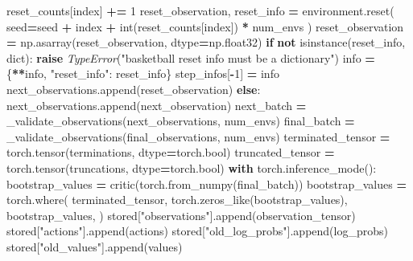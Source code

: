 \documentclass[
  american,
  11pt,
  letterpaper,
]{article}
\newenvironment{Shaded}{\begin{snugshade}}{\end{snugshade}}
\newcommand{\BuiltInTok}[1]{#1}
\newcommand{\ControlFlowTok}[1]{\textcolor[rgb]{0.13,0.29,0.53}{\textbf{#1}}}
\newcommand{\DecValTok}[1]{\textcolor[rgb]{0.00,0.00,0.81}{#1}}
\newcommand{\KeywordTok}[1]{\textcolor[rgb]{0.13,0.29,0.53}{\textbf{#1}}}
\newcommand{\NormalTok}[1]{#1}
\newcommand{\OperatorTok}[1]{\textcolor[rgb]{0.81,0.36,0.00}{\textbf{#1}}}
\newcommand{\PreprocessorTok}[1]{\textcolor[rgb]{0.56,0.35,0.01}{\textit{#1}}}
\newcommand{\StringTok}[1]{\textcolor[rgb]{0.31,0.60,0.02}{#1}}
\renewenvironment{Shaded}{\par\smallskip}{\par\smallskip}
\begin{document}
\begin{Shaded}
\begin{Highlighting}[]
\NormalTok{                reset\_counts[index] }\OperatorTok{+=} \DecValTok{1}
\NormalTok{                reset\_observation, reset\_info }\OperatorTok{=}\NormalTok{ environment.reset(}
\NormalTok{                    seed}\OperatorTok{=}\NormalTok{seed }\OperatorTok{+}\NormalTok{ index }\OperatorTok{+} \BuiltInTok{int}\NormalTok{(reset\_counts[index]) }\OperatorTok{*}\NormalTok{ num\_envs}
\NormalTok{                )}
\NormalTok{                reset\_observation }\OperatorTok{=}\NormalTok{ np.asarray(reset\_observation, dtype}\OperatorTok{=}\NormalTok{np.float32)}
                \ControlFlowTok{if} \KeywordTok{not} \BuiltInTok{isinstance}\NormalTok{(reset\_info, }\BuiltInTok{dict}\NormalTok{):}
                    \ControlFlowTok{raise} \PreprocessorTok{TypeError}\NormalTok{(}\StringTok{"basketball reset info must be a dictionary"}\NormalTok{)}
\NormalTok{                info }\OperatorTok{=}\NormalTok{ \{}\OperatorTok{**}\NormalTok{info, }\StringTok{"reset\_info"}\NormalTok{: reset\_info\}}
\NormalTok{                step\_infos[}\OperatorTok{{-}}\DecValTok{1}\NormalTok{] }\OperatorTok{=}\NormalTok{ info}
\NormalTok{                next\_observations.append(reset\_observation)}
            \ControlFlowTok{else}\NormalTok{:}
\NormalTok{                next\_observations.append(next\_observation)}
\NormalTok{        next\_batch }\OperatorTok{=}\NormalTok{ \_validate\_observations(next\_observations, num\_envs)}
\NormalTok{        final\_batch }\OperatorTok{=}\NormalTok{ \_validate\_observations(final\_observations, num\_envs)}
\NormalTok{        terminated\_tensor }\OperatorTok{=}\NormalTok{ torch.tensor(terminations, dtype}\OperatorTok{=}\NormalTok{torch.}\BuiltInTok{bool}\NormalTok{)}
\NormalTok{        truncated\_tensor }\OperatorTok{=}\NormalTok{ torch.tensor(truncations, dtype}\OperatorTok{=}\NormalTok{torch.}\BuiltInTok{bool}\NormalTok{)}
        \ControlFlowTok{with}\NormalTok{ torch.inference\_mode():}
\NormalTok{            bootstrap\_values }\OperatorTok{=}\NormalTok{ critic(torch.from\_numpy(final\_batch))}
\NormalTok{            bootstrap\_values }\OperatorTok{=}\NormalTok{ torch.where(}
\NormalTok{                terminated\_tensor,}
\NormalTok{                torch.zeros\_like(bootstrap\_values),}
\NormalTok{                bootstrap\_values,}
\NormalTok{            )}
\NormalTok{        stored[}\StringTok{"observations"}\NormalTok{].append(observation\_tensor)}
\NormalTok{        stored[}\StringTok{"actions"}\NormalTok{].append(actions)}
\NormalTok{        stored[}\StringTok{"old\_log\_probs"}\NormalTok{].append(log\_probs)}
\NormalTok{        stored[}\StringTok{"old\_values"}\NormalTok{].append(values)}

\end{Highlighting}
\end{Shaded}
\end{document}
